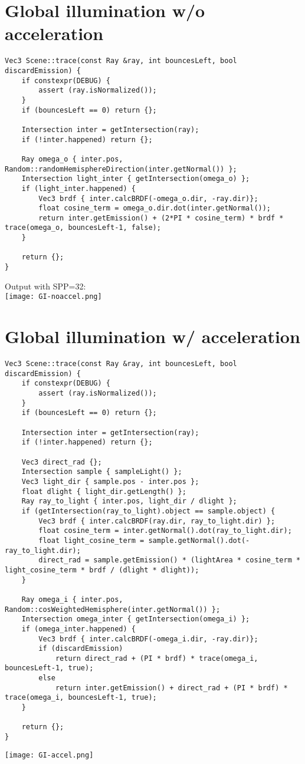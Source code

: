 \documentclass{article}
\begin{document}
\section{Global illumination w/o acceleration}
\begin{lstlisting}
Vec3 Scene::trace(const Ray &ray, int bouncesLeft, bool discardEmission) {
    if constexpr(DEBUG) {
        assert (ray.isNormalized());
    }
    if (bouncesLeft == 0) return {};

    Intersection inter = getIntersection(ray);
    if (!inter.happened) return {};

    Ray omega_o { inter.pos, Random::randomHemisphereDirection(inter.getNormal()) };
    Intersection light_inter { getIntersection(omega_o) };
    if (light_inter.happened) {
        Vec3 brdf { inter.calcBRDF(-omega_o.dir, -ray.dir)};
        float cosine_term = omega_o.dir.dot(inter.getNormal());
        return inter.getEmission() + (2*PI * cosine_term) * brdf * trace(omega_o, bouncesLeft-1, false);
    }

    return {};
}
\end{lstlisting}
Output with SPP=32:\\
\texttt{[image: GI-noaccel.png]}

\section{Global illumination w/ acceleration}
\begin{lstlisting}
Vec3 Scene::trace(const Ray &ray, int bouncesLeft, bool discardEmission) {
    if constexpr(DEBUG) {
        assert (ray.isNormalized());
    }
    if (bouncesLeft == 0) return {};

    Intersection inter = getIntersection(ray);
    if (!inter.happened) return {};

    Vec3 direct_rad {};
    Intersection sample { sampleLight() };
    Vec3 light_dir { sample.pos - inter.pos };
    float dlight { light_dir.getLength() };
    Ray ray_to_light { inter.pos, light_dir / dlight };
    if (getIntersection(ray_to_light).object == sample.object) {
        Vec3 brdf { inter.calcBRDF(ray.dir, ray_to_light.dir) };
        float cosine_term = inter.getNormal().dot(ray_to_light.dir);
        float light_cosine_term = sample.getNormal().dot(-ray_to_light.dir);
        direct_rad = sample.getEmission() * (lightArea * cosine_term * light_cosine_term * brdf / (dlight * dlight));
    }

    Ray omega_i { inter.pos, Random::cosWeightedHemisphere(inter.getNormal()) };
    Intersection omega_inter { getIntersection(omega_i) };
    if (omega_inter.happened) {
        Vec3 brdf { inter.calcBRDF(-omega_i.dir, -ray.dir)};
        if (discardEmission)
            return direct_rad + (PI * brdf) * trace(omega_i, bouncesLeft-1, true);
        else
            return inter.getEmission() + direct_rad + (PI * brdf) * trace(omega_i, bouncesLeft-1, true);
    }

    return {};
}
\end{lstlisting}
\texttt{[image: GI-accel.png]}
\end{document}
